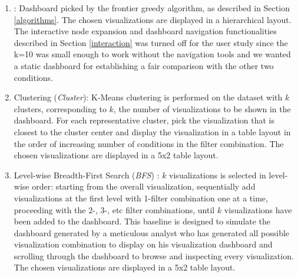 \begin{enumerate}
	\item \system: Dashboard picked by the frontier greedy algorithm, as described in Section \ref{algorithms}. The chosen visualizations are displayed in a hierarchical layout. The interactive node expansion and dashboard navigation functionalities described in Section \ref{interaction} was turned off for the user study since the k=10 was small enough to work without the navigation tools and we wanted a static dashboard for establishing a fair comparison with the other two conditions.
	\item Clustering (\textit{Cluster}): K-Means clustering is performed on the dataset with $k$ clusters, corresponding to $k$, the number of visualizations to be shown in the dashboard. For each representative cluster, pick the visualization that is closest to the cluster center and display the visualization in a table layout in the order of increasing number of conditions in the filter combination. The chosen visualizations are displayed in a 5x2 table layout.
	\item Level-wise Breadth-First Search (\textit{BFS}) : $k$ visualizations is selected in level-wise order: starting from the overall visualization, sequentially add visualizations at the first level with 1-filter combination one at a time, proceeding with the 2-, 3-, etc filter combinations, until $k$ visualizations have been added to the dashboard. This baseline is designed to simulate the dashboard generated by a meticulous analyst who has generated all possible visualization combination to display on his visualization dashboard and scrolling through the dashboard to browse and inspecting every visualization. The chosen visualizations are displayed in a 5x2 table layout.

\end{enumerate}
